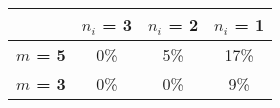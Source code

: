 \begin{tabular}{|l|c|c|c|}
\hline
&\textbf{$n_i$ = 3}&\textbf{$n_i$ = 2}&\textbf{$n_i$ = 1}\\\hline
\textbf{$m$ = 5}&0\%&5\%&17\%\\\hline
\textbf{$m$ = 3}&0\%&0\%&9\%\\\hline
\end{tabular}
